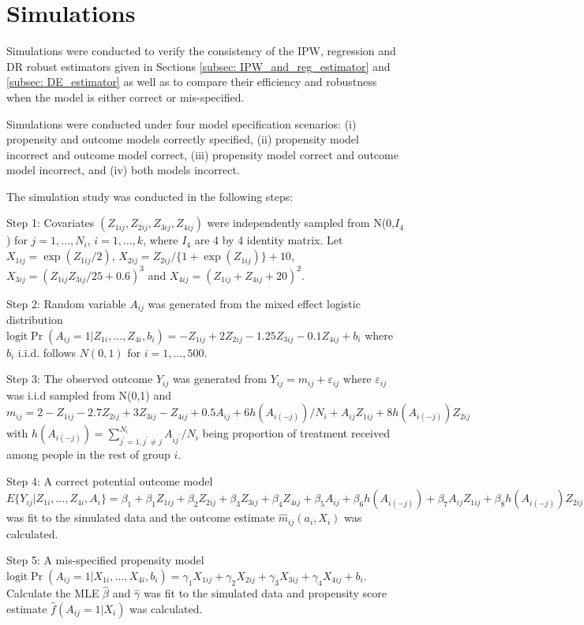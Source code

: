 \documentclass[oupdraft]{bio}
\begin{document}
\section{Simulations}\label{sec: DR_simulation}

Simulations were conducted to verify the consistency of the IPW, regression and DR robust estimators given in Sections \ref{subsec: IPW_and_reg_estimator} and \ref{subsec: DE_estimator} as well as to compare their efficiency and robustness when the model is either correct or mis-specified.

Simulations were conducted under four model specification scenarios: (i) propensity and outcome models correctly specified, (ii) propensity model incorrect and outcome model correct, (iii) propensity model correct and outcome model incorrect, and (iv) both models incorrect.

The simulation study was conducted in
the following steps:

\noindent \hangindent=1.5cm Step 1: Covariates $(Z_{1ij},Z_{2ij},Z_{3ij},Z_{4ij})$ were independently sampled from N(0,$I_4$) for $j = 1,\ldots,N_i$, $i=1,\ldots,k$, where $I_4$ are 4 by 4 identity matrix. Let $X_{1ij}=\exp(Z_{1ij}/2)$, $X_{2ij}=Z_{2ij}/\{1+\exp(Z_{1ij})\}+10$, $X_{3ij}=(Z_{1ij}Z_{3ij}/25+0.6)^3$ and $X_{4ij}=(Z_{1ij}+Z_{4ij}+20)^2$.

\noindent \hangindent=1.5cm Step 2: Random variable $A_{ij}$ was generated from the mixed effect logistic distribution $\mbox{logit}\Pr(A_{ij}=1|Z_{1i},\ldots,Z_{4i},b_i)=-Z_{1ij}+2Z_{2ij}-1.25Z_{3ij}-0.1Z_{4ij}+b_i$ where $b_{i}$ i.i.d. follows $N(0,1)$ for $i=1,\ldots,500$.

\noindent \hangindent=1.5cm Step 3: The observed outcome $Y_{ij}$ was generated from $Y_{ij}=m_{ij}+\varepsilon_{ij}$ where $\varepsilon_{ij}$ was i.i.d sampled from N(0,1) and $m_{ij}=2-Z_{1ij}-2.7Z_{2ij}+3Z_{3ij}-Z_{4ij}+0.5A_{ij}+6h(A_{i(-j)})/N_i+A_{ij}Z_{1ij}+8h(A_{i(-j)})Z_{2ij}$ with $h(A_{i(-j)})=\sum_{j^{'}=1,j^{'}\neq j}^{N_i}A_{ij^{'}}/N_i$ being proportion of treatment received among people in the rest of group $i$. 

\noindent \hangindent=1.5cm Step 4: A correct potential outcome model $E\{Y_{ij}|Z_{1i},\ldots,Z_{4i},A_i\}=\beta_1+
\beta_1Z_{1ij}+\beta_2Z_{2ij}+\beta_3Z_{3ij}+\beta_4Z_{4ij}+\beta_5A_{ij}+
\beta_6h(A_{i(-j)})+\beta_7A_{ij}Z_{1ij}+\beta_8h(A_{i(-j)})Z_{2ij}$ was fit to the simulated data and the outcome estimate $\hat{m}_{ij}(a_i,X_i)$ was calculated. 

\noindent \hangindent=1.5cm Step 5: A mis-specified propensity model $\mbox{logit}\Pr(A_{ij}=1|X_{1i},\ldots,X_{4i},b_i)=
\gamma_1X_{1ij}+\gamma_2X_{2ij}+\gamma_3X_{3ij}+\gamma_4X_{4ij}+b_i$.
 Calculate the MLE $\hat{\beta}$ and $\hat{\gamma}$ was fit to the simulated data and propensity score estimate $\hat{f}(A_{ij}=1|X_i)$ was calculated.
\end{document}
